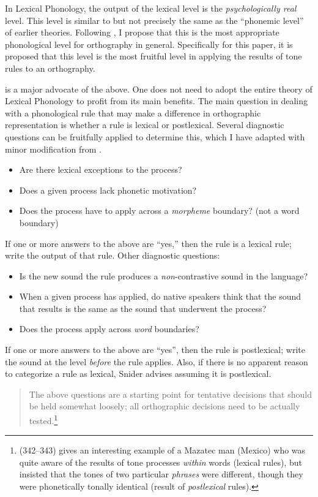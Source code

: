 \documentclass[output=paper]{langscibook}
\begin{document}
In Lexical Phonology, the output of the lexical level is the \textit{psychologically real} level. This level  is similar to but not precisely the same as the “phonemic level” of earlier theories. Following \citet{Snider2014}, I propose that this is the most appropriate phonological level for orthography in general. Specifically for this paper, it is proposed that this level is the most fruitful level in applying the results of tone rules to an orthography. 

\citet{Snider2014} is a major advocate of the above. One does not need to adopt the entire theory of Lexical Phonology to profit from its main benefits. The main question in dealing with a phonological rule that may make a difference in orthographic representation is whether a rule is lexical or postlexical. Several diagnostic questions can be fruitfully applied to determine this, which I have adapted with minor modification from \citet{Snider2014}. 

\begin{itemize}
    \item Are there lexical exceptions to the process? 
    \item Does a given process lack phonetic motivation?
    \item Does the process have to apply across a \textit{morpheme} boundary? (not a word boundary)
\end{itemize}

If one or more answers to the above are “yes,” then the rule is a lexical rule; write the output of that rule. Other diagnostic questions:

\begin{itemize}
    \item Is the new sound the rule produces a \textit{non}{}-contrastive sound in the language? 
    \item When a given process has applied, do native speakers think that the sound that results is the same as the sound that underwent the process?
    \item Does the process apply across \textit{word} boundaries? 
\end{itemize}

If one or more answers to the above are “yes”, then the rule is postlexical; write the sound at the level \textit{before} the rule applies. Also, if there is no apparent reason to categorize a rule as lexical, Snider advises assuming it is postlexical.

    \begin{quote}
      The above questions are a starting point for tentative decisions that should be held somewhat loosely; all orthographic decisions need to be actually tested.\footnote{\citet{Gudschinsky1958} (342–343) gives an interesting example of a Mazatec man (Mexico) who was quite aware of the results of tone processes \textit{within} words (lexical rules), but insisted that the tones of two particular \textit{phrases} were different, though they were phonetically tonally identical (result of \textit{postlexical} rules).}
    \end{quote}
    
\end{document}
